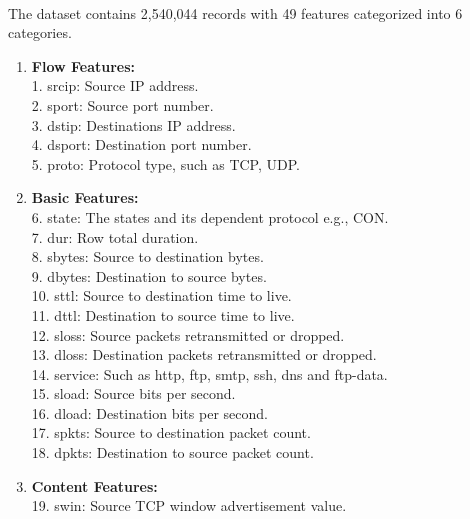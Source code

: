 \documentclass[a4paper,12pt]{article}
\begin{document}
            \paragraph{}
            The dataset contains 2,540,044 records with 49 features categorized into 6 categories.
            \begin{enumerate}
                \item \textbf{Flow Features:} \\
                    1. srcip: Source IP address. \\
                    2. sport: Source port number. \\
                    3. dstip: Destinations IP address. \\
                    4. dsport: Destination port number. \\
                    5. proto: Protocol type, such as TCP, UDP.
                \item \textbf{Basic Features:} \\
                    6. state: The states and its dependent protocol e.g., CON. \\
                    7. dur: Row total duration. \\
                    8. sbytes: Source to destination bytes. \\
                    9. dbytes: Destination to source bytes. \\
                    10. sttl: Source to destination time to live. \\
                    11. dttl: Destination to source time to live. \\
                    12. sloss: Source packets retransmitted or dropped. \\
                    13. dloss: Destination packets retransmitted or dropped. \\
                    14. service: Such as http, ftp, smtp, ssh, dns and ftp-data. \\
                    15. sload: Source bits per second. \\
                    16. dload: Destination bits per second. \\
                    17. spkts: Source to destination packet count. \\
                    18. dpkts: Destination to source packet count.
                \item \textbf{Content Features:} \\
                    19. swin: Source TCP window advertisement value. \\

\end{enumerate}
\end{document}
